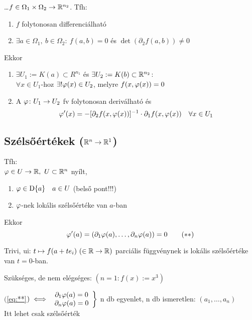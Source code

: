 \begin{te} \ldots $f\in\Omega_1\times \Omega_2\to\mathbb{R}^{n_2}$. Tfh:
  \begin{enumerate}[\quad(i)]
  \item $f$ folytonosan differenciálható
  \item $\exists a \in \Omega_1,\ b\in\Omega_2:\ f(a,b)=0$ és $\det(\partial_2f(a,b))\neq 0$
  \end{enumerate}
  Ekkor
  {\listazjbetu
    \begin{enumerate}
    \item $\exists U_1:= K(a)\subset R^{n_1}$ és $\exists U_2:=K(b)\subset \mathbb{R}^{n_2}$:\\
      $\forall x\in U_1$-hoz $\exists! \varphi(x)\in U_2$, melyre $f(x,\varphi(x)) = 0$
    \item A $\varphi\colon U_1\to U_2$ fv folytonosan deriválható és
      \[\varphi'(x) = - [\partial_2f(x,\varphi(x))]^{-1}\cdot \partial_1f(x,\varphi(x))\quad\forall x\in U_1 \]
    \end{enumerate}
      }
\end{te}

\subsection{Szélsőértékek ($\mathbb{R}^n\to \mathbb{R}^1$)}
\begin{te}
Tfh: \\$\varphi\in U\to\mathbb{R},\ U\subset \mathbb{R}^n$ nyílt,
\begin{enumerate}
\item $\varphi \in \operatorname{D}\{a\}\quad a\in U$ (belső pont!!!)
\item $\varphi$-nek lokális szélsőértéke van $a$-ban
\end{enumerate}
Ekkor  \[\varphi'(a) = (\partial_1\varphi(a),\dotsc,\partial_n\varphi(a))=0\tag{$**$}\label{eq:**}\]

\end{te}
\begin{biz}Trivi, ui: $t\mapsto f(a+te_i)\ (\in\R\n\R)$ parciális függvénynek is lokális szélsőértéke van $t=0$-ban.
\end{biz}

\begin{Megj}
\item Szükséges, de nem elégséges: $(n=1\colon f(x) := x^3)$
\item $($\ref{eq:**}$)\iff \left.\begin{array}{c}\partial_1\varphi(a)=0\\\partial_n\varphi(a)=0\end{array} \right\}$
  n db egyenlet, n db ismeretlen: $(a_1,\dotsc,a_n)$\\
  Itt lehet csak szélsőérték
\end{Megj}

